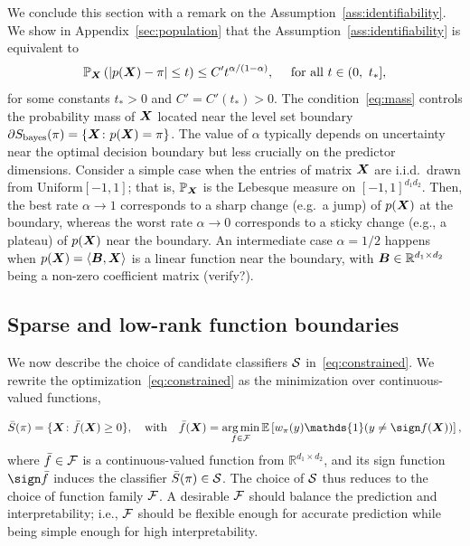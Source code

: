 \documentclass[12pt]{article}
\begin{document}
We conclude this section with a remark on the Assumption~\ref{ass:identifiability}. We show in Appendix~\ref{sec:population} that the Assumption~\ref{ass:identifiability} is equivalent to
\begin{equation}\label{eq:mass}
\mathbb{P}_{\bm X}\left(|p(\bm X)-\pi|\leq t \right) \leq C't^{\alpha/(1-\alpha)}, \quad \text{ for all }t\in (0,\ t_*],
\end{equation}
for some constants $t_*>0$ and $C'=C'(t_*)>0$. The condition~\eqref{eq:mass} controls the probability mass of $\bm X$ located near the level set boundary $\partial S_{\text{bayes}}(\pi)=\{\bm X\colon p(\bm X)=\pi \}$. The value of $\alpha$ typically depends on uncertainty near the optimal decision boundary but less crucially on the predictor dimensions. Consider a simple case when the entries of matrix $\bm X$ are i.i.d.\ drawn from $\text{Uniform}[-1,1]$; that is, $\mathbb{P}_{\bm X}$ is the Lebesque measure on $[-1,1]^{d_1d_2}$. Then, the best rate $\alpha\to 1$ corresponds to a sharp change (e.g.\ a jump) of $p(\bm X)$ at the boundary, whereas the worst rate $\alpha\to 0$ corresponds to a sticky change (e.g., a plateau) of $p(\bm X)$ near the boundary. An intermediate case $\alpha=1/2$ happens when $p(\bm X)=\langle \bm B, \bm X\rangle$ is a linear function near the boundary, with $\bm B\in\mathbb{R}^{d_1\times d_2}$ being a non-zero coefficient matrix {\color{red}(verify?)}. 



\subsection{Sparse and low-rank function boundaries}\label{subsec:linear class}
We now describe the choice of candidate classifiers $\mathcal{S}$ in~\eqref{eq:constrained}. We rewrite the optimization~\eqref{eq:constrained} as the minimization over continuous-valued functions,

\begin{equation}\label{eq:optimization}
\bar S(\pi) = \{\mX\colon\bar f(\mX)\geq 0\},\quad  \text{with}\quad  \bar f(\mX)= \argmin_{f\in\tF}\mathbb{E}\left[w_\pi(y)\mathds{1}(y\neq \sign f(\mX))\right],
\end{equation}
where $\bar f\in\mathcal{F}$ is a continuous-valued function from $\mathbb{R}^{d_1\times d_2}$, and its sign function $\sign \bar f$ induces the classifier $\bar S(\pi)\in\mathcal{S}$. The choice of $\mathcal{S}$ thus reduces to the choice of function family $\mathcal{F}$. A desirable $\mathcal{F}$ should balance the prediction and interpretability; i.e., $\mathcal{F}$ should be flexible enough for accurate prediction while being simple enough for high interpretability. 
\end{document}

